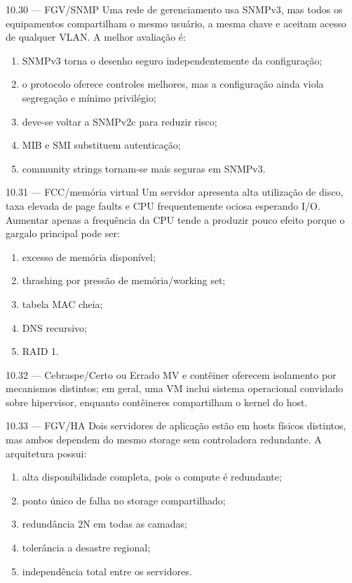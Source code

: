 \begin{questao}{ 10.30 — FGV/SNMP}
Uma rede de gerenciamento usa SNMPv3, mas todos os equipamentos compartilham o mesmo usuário, a mesma chave e aceitam acesso de qualquer VLAN. A melhor avaliação é:
\begin{enumerate}[label=\Alph*)]
\item SNMPv3 torna o desenho seguro independentemente da configuração;
\item o protocolo oferece controles melhores, mas a configuração ainda viola segregação e mínimo privilégio;
\item deve-se voltar a SNMPv2c para reduzir risco;
\item MIB e SMI substituem autenticação;
\item community strings tornam-se mais seguras em SNMPv3.
\end{enumerate}
\end{questao}

\begin{questao}{ 10.31 — FCC/memória virtual}
Um servidor apresenta alta utilização de disco, taxa elevada de page faults e CPU frequentemente ociosa esperando I/O. Aumentar apenas a frequência da CPU tende a produzir pouco efeito porque o gargalo principal pode ser:
\begin{enumerate}[label=\Alph*)]
\item excesso de memória disponível;
\item thrashing por pressão de memória/working set;
\item tabela MAC cheia;
\item DNS recursivo;
\item RAID 1.
\end{enumerate}
\end{questao}

\begin{questao}{ 10.32 — Cebraspe/Certo ou Errado}
MV e contêiner oferecem isolamento por mecanismos distintos; em geral, uma VM inclui sistema operacional convidado sobre hipervisor, enquanto contêineres compartilham o kernel do host.
\end{questao}

\begin{questao}{ 10.33 — FGV/HA}
Dois servidores de aplicação estão em hosts físicos distintos, mas ambos dependem do mesmo storage sem controladora redundante. A arquitetura possui:
\begin{enumerate}[label=\Alph*)]
\item alta disponibilidade completa, pois o compute é redundante;
\item ponto único de falha no storage compartilhado;
\item redundância 2N em todas as camadas;
\item tolerância a desastre regional;
\item independência total entre os servidores.
\end{enumerate}
\end{questao}

